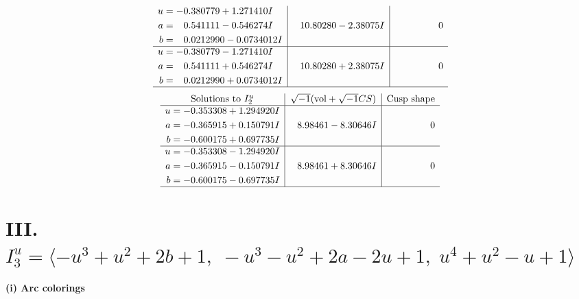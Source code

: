\documentclass[1p]{elsarticle_modified}
\theoremstyle{definition}
\newcommand{\I}{\sqrt{-1}}
\begin{document}
$$\begin{array}{c|c|c}
\begin{aligned}
u &= -0.380779 + 1.271410 I \\
a &= \phantom{-}0.541111 - 0.546274 I \\
b &= \phantom{-}0.0212990 - 0.0734012 I\end{aligned}
 & \phantom{-}10.80280 - 2.38075 I & \phantom{-0.000000 } 0 \\ \hline\begin{aligned}
u &= -0.380779 - 1.271410 I \\
a &= \phantom{-}0.541111 + 0.546274 I \\
b &= \phantom{-}0.0212990 + 0.0734012 I\end{aligned}
 & \phantom{-}10.80280 + 2.38075 I & \phantom{-0.000000 } 0\\
 \hline 
 \end{array}$$\newpage$$\begin{array}{c|c|c}  
\text{Solutions to }I^u_{2}& \I (\text{vol} + \sqrt{-1}CS) & \text{Cusp shape}\\
 \hline 
\begin{aligned}
u &= -0.353308 + 1.294920 I \\
a &= -0.365915 + 0.150791 I \\
b &= -0.600175 + 0.697735 I\end{aligned}
 & \phantom{-}8.98461 - 8.30646 I & \phantom{-0.000000 } 0 \\ \hline\begin{aligned}
u &= -0.353308 - 1.294920 I \\
a &= -0.365915 - 0.150791 I \\
b &= -0.600175 - 0.697735 I\end{aligned}
 & \phantom{-}8.98461 + 8.30646 I & \phantom{-0.000000 } 0\\
 \hline 
 \end{array}$$\newpage\newpage\renewcommand{\arraystretch}{1}
\centering \section*{III. $I^u_{3}= \langle - u^3+u^2+2 b+1,\;- u^3- u^2+2 a-2 u+1,\;u^4+u^2- u+1 \rangle$}
\flushleft \textbf{(i) Arc colorings}\\
\end{document}
